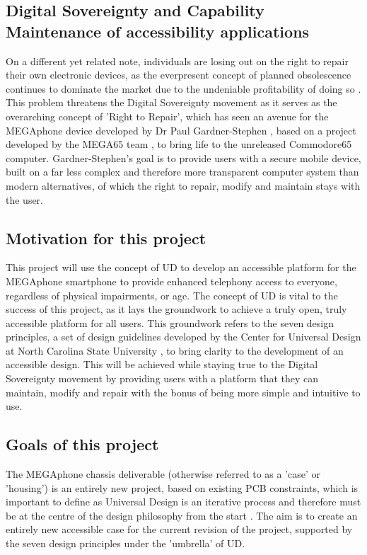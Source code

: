 \subsection{Digital Sovereignty and Capability Maintenance of accessibility applications} %
On a different yet related note, individuals are losing out on the right to repair their own electronic devices, as the everpresent concept of planned obsolescence continues to dominate the market due to the undeniable profitability of doing so \cite{obsolescence2}.
This problem threatens the Digital Sovereignty movement as it serves as the overarching concept of 'Right to Repair', which has seen an avenue for the MEGAphone device developed by Dr Paul Gardner-Stephen \cite{mobilehistory}, based on a project developed by the MEGA65 team \cite{mega65}, to bring life to the unreleased Commodore65 computer. %
Gardner-Stephen's goal is to provide users with a secure mobile device, built on a far less complex and therefore more transparent computer system than modern alternatives, of which the right to repair, modify and maintain stays with the user.

\subsection{Motivation for this project} %
This project will use the concept of UD to develop an accessible platform for the MEGAphone smartphone to provide enhanced telephony access to everyone, regardless of physical impairments, or age.
The concept of UD is vital to the success of this project, as it lays the groundwork to achieve a truly open, truly accessible platform for all users. 
This groundwork refers to the seven design principles, a set of design guidelines developed by the Center for Universal Design at North Carolina State University \cite{sevenprinciples}, to bring clarity to the development of an accessible design.
This will be achieved while staying true to the Digital Sovereignty movement by providing users with a platform that they can maintain, modify and repair with the bonus of being more simple and intuitive to use.

\subsection{Goals of this project}
The MEGAphone chassis deliverable (otherwise referred to as a 'case' or 'housing') is an entirely new project, based on existing PCB constraints, which is important to define as Universal Design is an iterative process and therefore must be at the centre of the design philosophy from the start \cite{incldesign}.
The aim is to create an entirely new accessible case for the current revision of the project, supported by the seven design principles under the 'umbrella' of UD.

